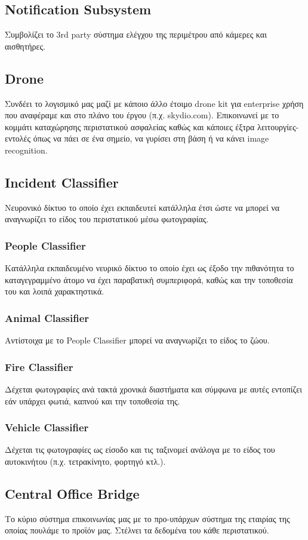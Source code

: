 \documentclass{article}
\begin{document}
\subsection{Notification Subsystem}
Συμβολίζει το 3rd party σύστημα ελέγχου της περιμέτρου από κάμερες και αισθητήρες.

\subsection{Drone}
Συνδέει το λογισμικό μας μαζί με κάποιο άλλο έτοιμο drone kit για enterprise χρήση που αναφέραμε και στο πλάνο του έργου (π.χ. skydio.com). Επικοινωνεί με το κομμάτι καταχώρησης περιστατικού ασφαλείας καθώς και κάποιες έξτρα λειτουργίες-εντολές όπως να πάει σε ένα σημείο, να γυρίσει στη βάση ή να κάνει image recognition.
\subsection{Incident Classifier}
Νευρονικό δίκτυο το οποίο έχει εκπαιδευτεί κατάλληλα έτσι ώστε να μπορεί να αναγνωρίζει το είδος του περιστατικού μέσω φωτογραφίας.
\subsubsection{People Classifier}
Κατάλληλα εκπαιδευμένο νευρικό δίκτυο το οποίο έχει ως έξοδο την πιθανότητα το καταγεγραμμένο άτομο να έχει παραβατική συμπεριφορά, καθώς και την τοποθεσία του και λοιπά χαρακτηστικά.
\subsubsection{Animal Classifier}
Αντίστοιχα με το People Classifier μπορεί να αναγνωρίζει το είδος το ζώου.
\subsubsection{Fire Classifier}
Δέχεται φωτογραφίες ανά τακτά χρονικά διαστήματα και σύμφωνα με αυτές εντοπίζει εάν υπάρχει φωτιά, καπνού και την τοποθεσία της.
\subsubsection{Vehicle Classifier}
Δέχεται τις φωτογραφίες ως είσοδο και τις ταξινομεί ανάλογα με το είδος του αυτοκινήτου (π.χ. τετρακίνητο, φορτηγό κτλ.).

\subsection{Central Office Bridge}
Το κύριο σύστημα επικοινωνίας μας με το προ-υπάρχων σύστημα της εταιρίας της οποίας πουλάμε το προϊόν μας. Στέλνει τα δεδομένα του κάθε περιστατικού.
\end{document}
